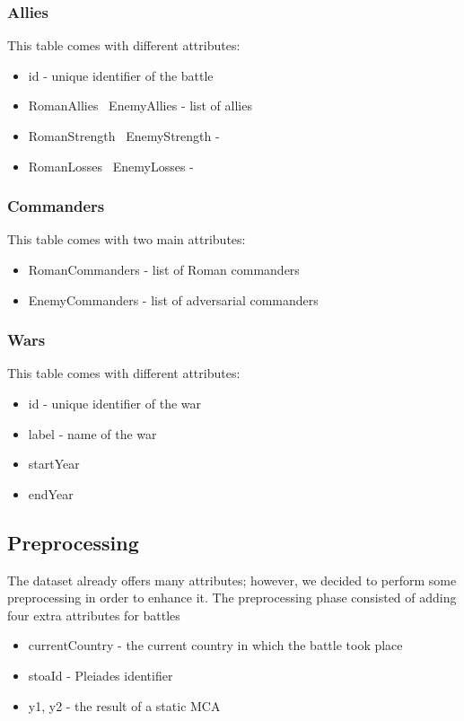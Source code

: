\subsubsection{Allies}
This table comes with different attributes:
\begin{itemize}
    \item id - unique identifier of the battle
    \item RomanAllies \ EnemyAllies - list of allies
    \item RomanStrength \ EnemyStrength -
    \item RomanLosses \ EnemyLosses -
\end{itemize}

\subsubsection{Commanders}
This table comes with two main attributes:
\begin{itemize}
    \item RomanCommanders - list of Roman commanders
    \item EnemyCommanders - list of adversarial commanders
\end{itemize}

\subsubsection{Wars}
This table comes with different attributes:
\begin{itemize}
    \item id - unique identifier of the war
    \item label - name of the war
    \item startYear
    \item endYear
\end{itemize}

\subsection{Preprocessing}
The dataset already offers many attributes; however, we decided to perform some preprocessing in order to enhance it. The preprocessing phase consisted of adding four extra attributes for battles
\begin{itemize}
    \item currentCountry - the current country in which the battle took place
    \item stoaId - Pleiades identifier
    \item y1, y2 - the result of a static MCA
\end{itemize}

